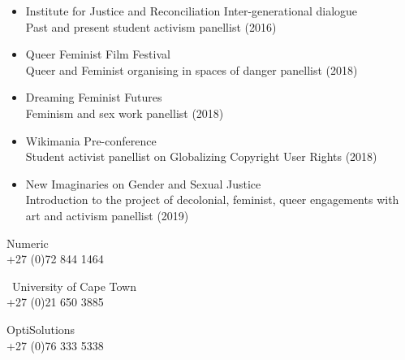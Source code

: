 











\begin{itemize}
\item Institute for Justice and Reconciliation Inter-generational dialogue\\
Past and present student activism panellist (2016)
\item Queer Feminist Film Festival\\
Queer and Feminist organising in spaces of danger panellist (2018)
\item Dreaming Feminist Futures\\
Feminism and sex work panellist (2018)
\item Wikimania Pre-conference\\ 
Student activist panellist on Globalizing Copyright User Rights (2018)
\item New Imaginaries on Gender and Sexual Justice\\
Introduction to the project of decolonial, feminist, queer engagements with art and activism panellist (2019)
\end{itemize}





{Numeric \\ +27 (0)72 844 1464}

\divider 

{\ University of Cape Town \\ +27 (0)21 650 3885}

\divider

{OptiSolutions \\ +27 (0)76 333 5338}



